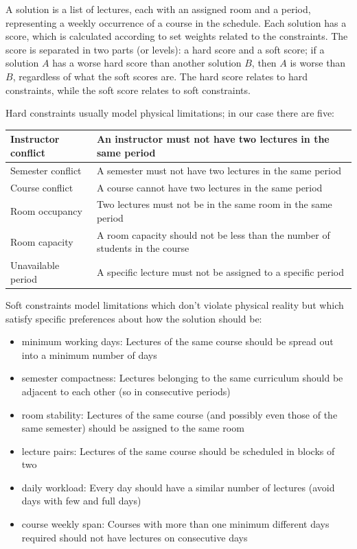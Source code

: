 \documentclass[12pt, a4paper, english]{report}
\def\bullet{\(\triangleright\)}
\begin{document}
A solution is a list of lectures, each with an assigned room and a period, representing a weekly occurrence of a course in the schedule. Each solution has a score, which is calculated according to set weights related to the constraints. The score is separated in two parts (or levels): a hard score and a soft score; if a solution \(A\) has a worse hard score than another solution \(B\), then \(A\) is worse than \(B\), regardless of what the soft scores are. The hard score relates to hard constraints, while the soft score relates to soft constraints.\par
Hard constraints usually model physical limitations; in our case there are five:
\begin{table}[h]
\begin{tabular}{|p{4cm}|p{9cm}|}\hline
Instructor conflict & An instructor must not have two lectures in the same period\\\hline
Semester conflict   & A semester must not have two lectures in the same period\\\hline
Course conflict     & A course cannot have two lectures in the same period\\\hline
Room occupancy      & Two lectures must not be in the same room in the same period\\\hline
Room capacity       & A room capacity should not be less than the number of students in the course\\\hline
Unavailable period  & A specific lecture must not be assigned to a specific period\\\hline
\end{tabular}
\end{table}

Soft constraints model limitations which don't violate physical reality but which satisfy specific preferences about how the solution should be:
\begin{itemize}[label=\bullet]
\item minimum working days: Lectures of the same course should be spread out into a minimum number of days
\item semester compactness: Lectures belonging to the same curriculum should be adjacent to each other (so in consecutive periods)
\item room stability: Lectures of the same course (and possibly even those of the same semester) should be assigned to the same room
\item lecture pairs: Lectures of the same course should be scheduled in blocks of two
\item daily workload: Every day should have a similar number of lectures (avoid days with few and full days)
\item course weekly span: Courses with more than one minimum different days required should not have lectures on consecutive days
\end{itemize}
\end{document}

